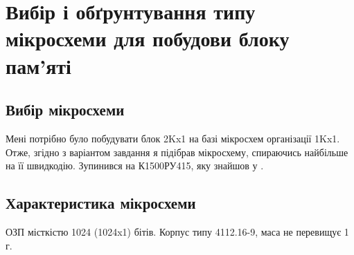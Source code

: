 \documentclass[a4paper, 12pt, oneside]{extreport}
\begin{document}






\chapter{Вибір і обґрунтування типу мікросхеми для побудови блоку пам'яті}

\section{Вибір мікросхеми}

Мені потрібно було побудувати блок 2Kx1 на базі мікросхем організації 1Kx1.
Отже, згідно з варіантом завдання я підібрав мікросхему, спираючись найбільше
на її швидкодію. Зупинився на К1500РУ415, яку знайшов у \parencite[ст. 485]{nefedov9}.

\section{Характеристика мікросхеми}

ОЗП місткістю 1024 (1024x1) бітів. Корпус типу 4112.16-9, маса не перевищує 1 г.

\end{document}
